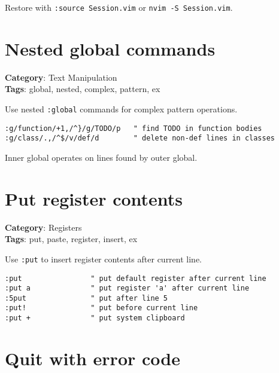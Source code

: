 {{{{{Restore with {\footnotesize \Verb§:source Session.vim§} or {\footnotesize \Verb§nvim -S Session.vim§}.

\section{Nested global commands}

\textbf{Category}: Text Manipulation\\ \textbf{Tags}: global, nested, complex, pattern, ex
\vspace{0.5cm}

Use nested {\footnotesize \Verb§:global§} commands for complex pattern operations.

\begin{Exa*}{}
\begin{Verbatim}[fontsize=\footnotesize, breaklines, breakanywhere]
:g/function/+1,/^}/g/TODO/p   " find TODO in function bodies
:g/class/.,/^$/v/def/d        " delete non-def lines in classes
\end{Verbatim}
\end{Exa*}

Inner global operates on lines found by outer global.

\section{Put register contents}

\textbf{Category}: Registers\\ \textbf{Tags}: put, paste, register, insert, ex
\vspace{0.5cm}

Use {\footnotesize \Verb§:put§} to insert register contents after current line.

\begin{Exa*}{}
\begin{Verbatim}[fontsize=\footnotesize, breaklines, breakanywhere]
:put                " put default register after current line
:put a              " put register 'a' after current line
:5put               " put after line 5
:put!               " put before current line
:put +              " put system clipboard
\end{Verbatim}
\end{Exa*}

\section{Quit with error code}

}}}}}
